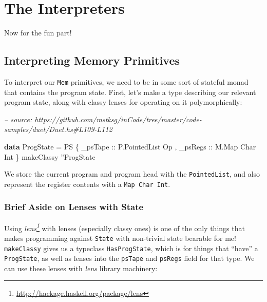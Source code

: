 \documentclass[]{article}
\newenvironment{Shaded}{}{}
\newcommand{\CharTok}[1]{\textcolor[rgb]{0.25,0.44,0.63}{#1}}
\newcommand{\CommentTok}[1]{\textcolor[rgb]{0.38,0.63,0.69}{\textit{#1}}}
\newcommand{\DataTypeTok}[1]{\textcolor[rgb]{0.56,0.13,0.00}{#1}}
\newcommand{\FunctionTok}[1]{\textcolor[rgb]{0.02,0.16,0.49}{#1}}
\newcommand{\KeywordTok}[1]{\textcolor[rgb]{0.00,0.44,0.13}{\textbf{#1}}}
\newcommand{\NormalTok}[1]{#1}
\newcommand{\OtherTok}[1]{\textcolor[rgb]{0.00,0.44,0.13}{#1}}
\renewcommand{\href}[2]{#2\footnote{\url{#1}}}
\begin{document}
\hypertarget{the-interpreters}{%
\section{The Interpreters}\label{the-interpreters}}

Now for the fun part!

\hypertarget{interpreting-memory-primitives}{%
\subsection{Interpreting Memory
Primitives}\label{interpreting-memory-primitives}}

To interpret our \texttt{Mem} primitives, we need to be in some sort of stateful
monad that contains the program state. First, let's make a type describing our
relevant program state, along with classy lenses for operating on it
polymorphically:

\begin{Shaded}
\begin{Highlighting}[]
\CommentTok{-- source: https://github.com/mstksg/inCode/tree/master/code-samples/duet/Duet.hs#L109-L112}

\KeywordTok{data} \DataTypeTok{ProgState} \FunctionTok{=} \DataTypeTok{PS}\NormalTok{ \{}\OtherTok{ _psTape ::} \DataTypeTok{P.PointedList} \DataTypeTok{Op}
\NormalTok{                    ,}\OtherTok{ _psRegs ::} \DataTypeTok{M.Map} \DataTypeTok{Char} \DataTypeTok{Int}
\NormalTok{                    \}}
\NormalTok{makeClassy }\CharTok{''}\DataTypeTok{ProgState}
\end{Highlighting}
\end{Shaded}

We store the current program and program head with the \texttt{PointedList}, and
also represent the register contents with a \texttt{Map\ Char\ Int}.

\hypertarget{brief-aside-on-lenses-with-state}{%
\subsubsection{Brief Aside on Lenses with
State}\label{brief-aside-on-lenses-with-state}}

Using \emph{\href{http://hackage.haskell.org/package/lens}{lens}} with lenses
(especially classy ones) is one of the only things that makes programming
against \texttt{State} with non-trivial state bearable for me!
\texttt{makeClassy} gives us a typeclass \texttt{HasProgState}, which is for
things that ``have'' a \texttt{ProgState}, as well as lenses into the
\texttt{psTape} and \texttt{psRegs} field for that type. We can use these lenses
with \emph{lens} library machinery:
\end{document}

